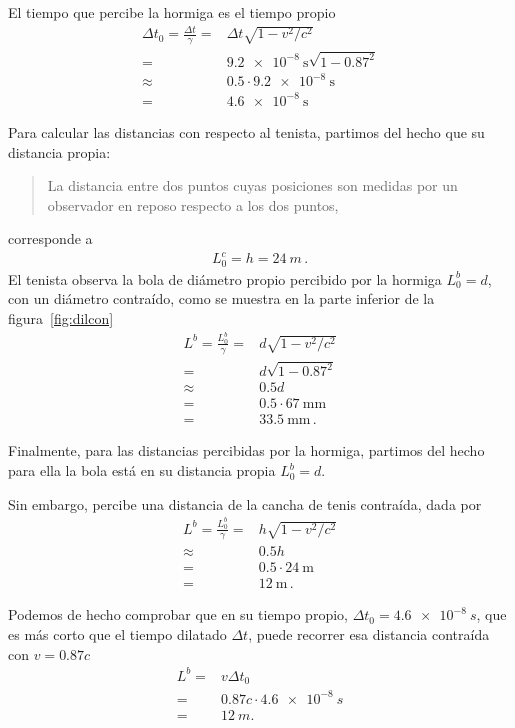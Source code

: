 \documentclass[11pt,a4paper]{book}
\begin{document}
\begin{enumerate}
El tiempo que percibe la hormiga es el tiempo propio
\begin{align}
    \Delta t_0 = \frac{\Delta t}{\gamma} =& \Delta t \sqrt{1-v^2/c^2} \nonumber\\
    =& \qty{9.2e-8}{\s} \sqrt{1-0.87^2} \nonumber\\
 \approx &0.5\cdot \qty{9.2e-8}{\s} \nonumber\\
    =& \qty{4.6e-8}{\s}
\end{align}

Para calcular las distancias con respecto al tenista, partimos del hecho que su distancia propia:
\begin{quote}
    La distancia entre dos puntos cuyas posiciones son medidas por
un observador en reposo respecto a los dos puntos,
\end{quote}
corresponde a 
\begin{align*}
    L_0^{c} = h = \qty{24}{m}\,.
\end{align*}
El tenista observa la bola de diámetro propio percibido por la hormiga $L^b_0 = d$, con un diámetro contraído, como se muestra en la parte inferior de la figura~\ref{fig:dilcon}
\begin{align*}
    L^b = \frac{L^b_0}{\gamma} =& d \sqrt{1-v^2/c^2} \\
        =& d\sqrt{1-0.87^2}\\
        \approx& 0.5d\\
    =& 0.5\cdot \qty{67}{\milli\m}\\
    =& \qty{33.5}{\milli\m}\,.
\end{align*}

Finalmente, para las distancias percibidas por la hormiga, partimos del hecho para ella la bola está en su distancia propia $L^b_0 = d$.

Sin embargo, percibe una distancia de la cancha de tenis contraída, dada por
\begin{align*}
    L^{b} = \frac{L^b_0}{\gamma} =& h\sqrt{1-v^2/c^2}\\
    \approx& 0.5 h\\
        =& 0.5\cdot \qty{24}{\m}\\
    =& \qty{12}{\m}\,.
\end{align*}

Podemos de hecho comprobar que en su tiempo propio, $\Delta t_0 = \qty{4.6e-8}{s}$, que es más corto que el tiempo dilatado $\Delta t$, puede recorrer esa distancia contraída con $v=0.87c$
\begin{align*}
    L^{b} = &v \Delta t_0 \\
    =&0.87 c \cdot \qty{4.6e-8}{s}\\
    =&\qty{12}{ m }.
\end{align*}


\end{enumerate}
\end{document}
